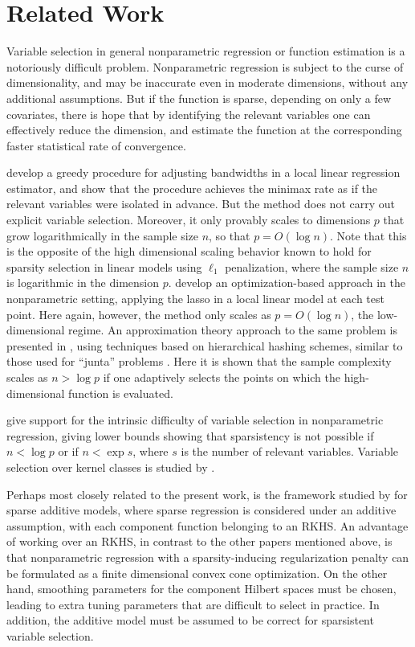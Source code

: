 \section{Related Work}

Variable selection in general nonparametric regression or function
estimation is a notoriously difficult problem.  
Nonparametric regression is subject to the curse
of dimensionality,
and may be inaccurate even in moderate dimensions,
without any additional assumptions.  But if the function is sparse, depending
on only a few covariates, there is hope that by identifying
the relevant variables one can effectively reduce the 
dimension, and  estimate the function at the
corresponding faster statistical rate of convergence.

\citet{lafferty2008rodeo} develop a greedy procedure for
adjusting bandwidths in a local linear regression estimator,
and show that the procedure achieves the minimax rate
as if the relevant variables were isolated in advance.
But the method does not carry out explicit variable selection.
Moreover, it only provably scales to dimensions $p$ that 
grow logarithmically in the sample size $n$, so that $p = O(\log n)$.  Note that this
is the opposite of the high dimensional scaling behavior
known to hold for sparsity selection in linear models
using $\ell_1$ penalization, where the sample size $n$
is logarithmic in the dimension $p$. \citet{bertin:08}
develop an optimization-based approach in
the nonparametric setting, applying the lasso
in a local linear model at each test point.  Here again,
however, the method only scales as $p = O(\log n)$,
the low-dimensional regime.
An approximation theory approach to the same
problem is presented in \cite{devore:11}, 
using techniques based on hierarchical hashing schemes,
similar to those used for ``junta'' problems \cite{mossel:04}.
Here it is shown that the sample complexity scales as $n > \log p$ 
if one adaptively selects the points on
which the high-dimensional function is evaluated.

\citet{dalalyan:12} give
support for the intrinsic difficulty of variable
selection in nonparametric regression, giving lower bounds 
showing that sparsistency is not possible if $n < \log p$ or if $n <
\exp s$, where $s$ is the number of relevant variables.
Variable selection over kernel classes is studied
by \citet{Kolch:10}.  

Perhaps most closely related to the present work, is the framework
studied by \cite{Raskutti:12} for sparse additive models, where sparse
regression is considered under an additive assumption, with each
component function belonging to an RKHS.  An advantage of working over
an RKHS, in contrast to the other papers mentioned above, is that
nonparametric regression with a sparsity-inducing regularization penalty can be
formulated as a finite dimensional convex cone optimization.
On the other hand, 
smoothing parameters for the component Hilbert spaces
must be chosen, leading to extra tuning parameters
that are difficult to select in practice.  In addition, 
the additive model must be assumed to
be correct for sparsistent variable selection.

